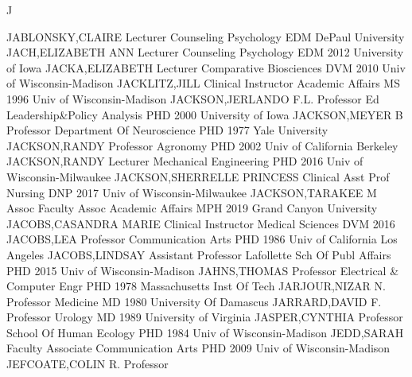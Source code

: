 \documentclass[
]{article}
\begin{document}
J

\textbar{}

JABLONSKY,CLAIRE \textbar Lecturer \textbar{} 
\textbar Counseling Psychology \textbar EDM DePaul University
\textbar JACH,ELIZABETH ANN \textbar Lecturer \textbar{} 
\textbar Counseling Psychology \textbar EDM 2012 University of Iowa
\textbar JACKA,ELIZABETH \textbar Lecturer \textbar{} 
\textbar Comparative Biosciences \textbar DVM 2010 Univ of
Wisconsin-Madison \textbar JACKLITZ,JILL \textbar Clinical Instructor
\textbar{}  \textbar Academic Affairs \textbar MS 1996 Univ
of Wisconsin-Madison \textbar JACKSON,JERLANDO F.L. \textbar Professor
\textbar{}  \textbar Ed Leadership\&Policy Analysis
\textbar PHD 2000 University of Iowa \textbar JACKSON,MEYER B
\textbar Professor \textbar{}  \textbar Department Of
Neuroscience \textbar PHD 1977 Yale University \textbar JACKSON,RANDY
\textbar Professor \textbar{}  \textbar Agronomy
\textbar PHD 2002 Univ of California Berkeley \textbar JACKSON,RANDY
\textbar Lecturer \textbar{}  \textbar Mechanical
Engineering \textbar PHD 2016 Univ of Wisconsin-Milwaukee
\textbar JACKSON,SHERRELLE PRINCESS \textbar Clinical Asst Prof
\textbar{}  \textbar Nursing \textbar DNP 2017 Univ of
Wisconsin-Milwaukee \textbar JACKSON,TARAKEE M \textbar Assoc Faculty
Assoc \textbar{}  \textbar Academic Affairs \textbar MPH
2019 Grand Canyon University \textbar JACOBS,CASANDRA MARIE
\textbar Clinical Instructor \textbar{}  \textbar Medical
Sciences \textbar DVM 2016 \textbar JACOBS,LEA \textbar Professor
\textbar{}  \textbar Communication Arts \textbar PHD 1986
Univ of California Los Angeles \textbar JACOBS,LINDSAY
\textbar Assistant Professor \textbar{}  \textbar Lafollette
Sch Of Publ Affairs \textbar PHD 2015 Univ of Wisconsin-Madison
\textbar JAHNS,THOMAS \textbar Professor \textbar{} 
\textbar Electrical \& Computer Engr \textbar PHD 1978 Massachusetts
Inst Of Tech \textbar JARJOUR,NIZAR N. \textbar Professor \textbar{}
 \textbar Medicine \textbar MD 1980 University Of Damascus
\textbar JARRARD,DAVID F. \textbar Professor \textbar{} 
\textbar Urology \textbar MD 1989 University of Virginia
\textbar JASPER,CYNTHIA \textbar Professor \textbar{} 
\textbar School Of Human Ecology \textbar PHD 1984 Univ of
Wisconsin-Madison \textbar JEDD,SARAH \textbar Faculty Associate
\textbar{}  \textbar Communication Arts \textbar PHD 2009
Univ of Wisconsin-Madison \textbar JEFCOATE,COLIN R. \textbar Professor
\end{document}
